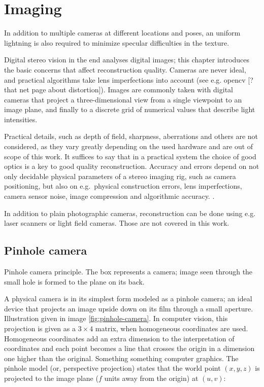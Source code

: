\section{Imaging}

In addition to multiple cameras at different locations and poses, an uniform lightning is also required to minimize specular difficulties in the texture.


Digital stereo vision in the end analyses digital images; this chapter introduces the basic concerns that affect reconstruction quality. Cameras are never ideal, and practical algorithms take lens imperfections into account (see e.g. opencv [? that net page about distortion]). Images are commonly taken with digital cameras that project a three-dimensional view from a single viewpoint to an image plane, and finally to a discrete grid of numerical values that describe light intensities.

Practical details, such as depth of field, sharpness, aberrations and others are not considered, as they vary greatly depending on the used hardware and are out of scope of this work.
It suffices to say that in a practical system the choice of good optics is a key to good quality reconstruction.
Accuracy and errors depend on not only decidable physical parameters of a stereo imaging rig, such as camera positioning, but also on e.g.~physical construction errors, lens imperfections, camera sensor noise, image compression and algorithmic accuracy. \cite{hollsten2013imagequality, kyto2011method}.

In addition to plain photographic cameras, reconstruction can be done using e.g. laser scanners or light field cameras. Those are not covered in this work.

\subsection{Pinhole camera}

{Pinhole camera principle. The box represents a camera; image seen through the small hole is formed to the plane on its back.}

A physical camera is in its simplest form modeled as a pinhole camera; an ideal device that projects an image upside down on its film through a small aperture.
Illustration given in image \ref{fig:pinhole-camera}.
In computer vision, this projection is given as a $3 \times 4$ matrix, when homogeneous coordinates \cite{hartley03multiview,heyden2005multiple} are used. Homogeneous coordinates add an extra dimension to the interpretation of coordinates and each point becomes a line that crosses the origin in a dimension one higher than the original. Something something computer graphics.
The pinhole model (or, perspective projection) states that the world point $(x, y, z)$ is projected to the image plane ($f$ units away from the origin) at $(u, v)$:

